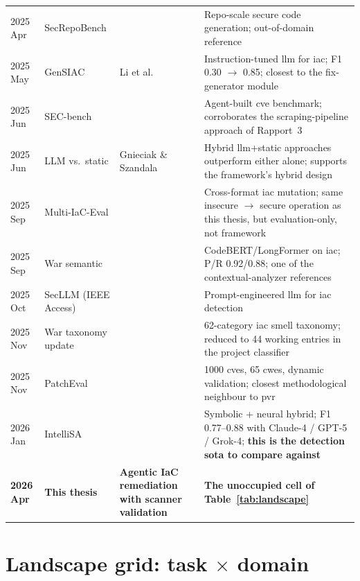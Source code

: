 \documentclass[12pt, a4paper]{report}
\begin{document}
\begin{table}[H]
\begin{tabularx}{\linewidth}{lll X}
    2025 Apr & SecRepoBench & \citep{secrepobench2025} & Repo-scale secure code generation; out-of-domain reference \\
    2025 May & GenSIAC & Li et al.~\citep{li2025gensiac} & Instruction-tuned \gls{llm} for \gls{iac}; F1 0.30 $\to$ 0.85; closest to the fix-generator module \\
    2025 Jun & SEC-bench & \citep{secbench2025} & Agent-built \gls{cve} benchmark; corroborates the scraping-pipeline approach of Rapport~3 \\
    2025 Jun & LLM vs.\ static & Gnieciak \& Szandala~\citep{gnieciak2025llmvsstatic} & Hybrid \gls{llm}+static approaches outperform either alone; supports the framework's hybrid design \\
    2025 Sep & Multi-IaC-Eval & \citep{multi2025iaceval} & Cross-format \gls{iac} mutation; same insecure $\to$ secure operation as this thesis, but evaluation-only, not framework \\
    2025 Sep & War semantic & \citep{war2025detection} & CodeBERT/LongFormer on \gls{iac}; P/R 0.92/0.88; one of the contextual-analyzer references \\
    2025 Oct & SecLLM (IEEE Access) & \citep{devito2025secllm} & Prompt-engineered \gls{llm} for \gls{iac} detection \\
    2025 Nov & War taxonomy update & \citep{war2025taxonomy} & 62-category \gls{iac} smell taxonomy; reduced to 44 working entries in the project classifier \\
    2025 Nov & PatchEval & \citep{lyu2024patcheval} & 1000 \glspl{cve}, 65 \glspl{cwe}, dynamic validation; closest methodological neighbour to \gls{pvr} \\
    2026 Jan & IntelliSA & \citep{intellisa2026} & Symbolic + neural hybrid; F1 0.77--0.88 with Claude-4 / GPT-5 / Grok-4; \textbf{this is the detection \gls{sota} to compare against} \\
    \midrule
    \rowcolor{yellow!15}
    \textbf{2026 Apr} & \textbf{This thesis} &
    \textbf{Agentic IaC remediation with scanner validation} &
    \textbf{The unoccupied cell of Table~\ref{tab:landscape}} \\
    \bottomrule
  \end{tabularx}
\end{table}

\section{Landscape grid: task $\times$ domain}
\end{document}

